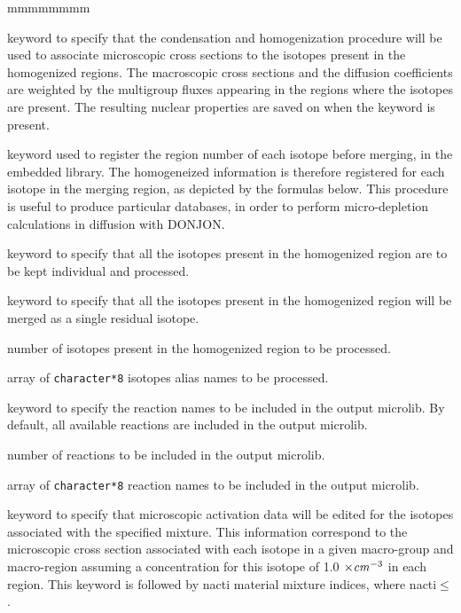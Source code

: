 \begin{ListeDeDescription}{mmmmmmmm}
\item[\moc{MICR}] keyword to specify that the condensation and homogenization
procedure will be used to associate microscopic cross sections to the isotopes
present in the homogenized regions. The macroscopic cross sections and the
diffusion coefficients are weighted by the multigroup fluxes appearing in the
regions where the isotopes are present. The resulting nuclear properties are
saved on  when the  keyword is present.

\item[\moc{ALLX}] keyword used to register the region number of each isotope before merging, in the 
embedded library. The homogeneized information is therefore registered for each isotope in the merging
region, as depicted by the formulas below. This procedure is useful to produce particular databases, 
in order to perform micro-depletion calculations in diffusion with DONJON.

\item[\moc{ALL}] keyword to specify that all the isotopes present in the
homogenized region are to be kept individual and processed.

\item[\moc{RES}] keyword to specify that all the isotopes present in the
homogenized region will be merged as a single residual isotope.

\item[\dusa{nis}] number of isotopes present in the homogenized
region to be processed.

\item[\dusa{HISO}] array of {\tt character*8} isotopes alias names to be processed.

\item[\moc{REAC}] keyword to specify the reaction names to be included in the output microlib. By default, all available reactions
are included in the output microlib.

\item[\dusa{nreac}] number of reactions to be included in the output microlib.

\item[\dusa{HREAC}] array of {\tt character*8} reaction names to be included in the output microlib.

\item[\moc{ACTI}] keyword to specify that microscopic activation
data will be edited for the isotopes associated with the specified mixture. This
information correspond to the microscopic cross section associated with each
isotope in a given macro-group and macro-region assuming a concentration
for this isotope of 1.0 $\times{\it cm}^{-3}$ in each region. This keyword is
followed by nacti material mixture indices, where
nacti$\le$.


\end{ListeDeDescription}
